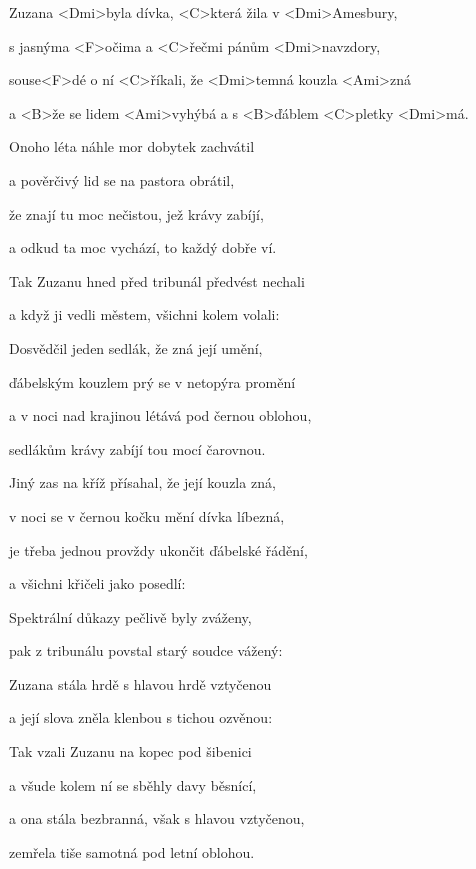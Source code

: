 

\zs
Zuzana <Dmi>byla dívka, <C>která žila v <Dmi>Amesbury,

s jasnýma <F>očima a <C>řečmi pánům <Dmi>navzdory,

souse<F>dé o ní <C>říkali, že <Dmi>temná kouzla <Ami>zná

a <B>že se lidem <Ami>vyhýbá a s <B>ďáblem <C>pletky <Dmi>má.
\ks

\zs
Onoho léta náhle mor dobytek zachvátil

a pověrčivý lid se na pastora obrátil,

že znají tu moc nečistou, jež krávy zabíjí,

a odkud ta moc vychází, to každý dobře ví.
\ks

\zs
Tak Zuzanu hned před tribunál předvést nechali

a když ji vedli městem, všichni kolem volali:

\ks

\zs
Dosvědčil jeden sedlák, že zná její umění,

ďábelským kouzlem prý se v netopýra promění

a v noci nad krajinou létává pod černou oblohou,

sedlákům krávy zabíjí tou mocí čarovnou.
\ks

\zs
Jiný zas na kříž přísahal, že její kouzla zná,

v noci se v černou kočku mění dívka líbezná,

je třeba jednou provždy ukončit ďábelské řádění,

a všichni křičeli jako posedlí: 
\ks

\zs
Spektrální důkazy pečlivě byly zváženy,

pak z tribunálu povstal starý soudce vážený:

\ks

\zs
Zuzana stála hrdě s hlavou hrdě vztyčenou

a její slova zněla klenbou s tichou ozvěnou:

\ks

\zs
Tak vzali Zuzanu na kopec pod šibenici

a všude kolem ní se sběhly davy běsnící,

a ona stála bezbranná, však s hlavou vztyčenou,

zemřela tiše samotná pod letní oblohou.
\ks

\kp

